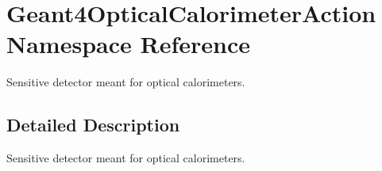 \hypertarget{namespace_geant4_optical_calorimeter_action}{}\section{Geant4\+Optical\+Calorimeter\+Action Namespace Reference}
\label{namespace_geant4_optical_calorimeter_action}


Sensitive detector meant for optical calorimeters.  




\subsection{Detailed Description}
Sensitive detector meant for optical calorimeters. 